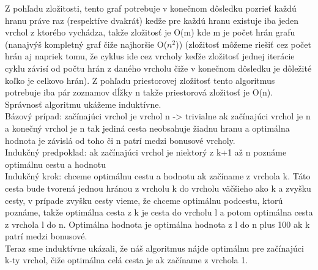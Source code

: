 \documentclass[a4paper]{article}
\begin{document}
Z pohľadu zložitosti, tento graf potrebuje v konečnom dôsledku pozrieť každú hranu práve raz (respektíve dvakrát) keďže pre každú hranu existuje iba jeden vrchol z ktorého vychádza, takže zložitosť je O(m) kde m je počet hrán grafu (nanajvýš kompletný graf čiže najhoršie O($n^2$)) (zložitosť môžeme riešiť cez počet hrán aj napriek tomu, že cyklus ide cez vrcholy keďže zložitosť jednej iterácie cyklu závisí od počtu hrán z daného vrcholu čiže v konečnom dôsledku je dôležité koľko je celkovo hrán). Z pohľadu priestorovej zložitosť tento algoritmus potrebuje iba pár zoznamov dĺžky n takže priestorová zložitosť je O(n).
\\

Správnosť algoritmu ukážeme induktívne. 
\\

Bázový prípad: začínajúci vrchol je vrchol n -> trivialne ak začínajúci vrchol je n a konečný vrchol je n tak jediná cesta neobsahuje žiadnu hranu a optimálna hodnota je závislá od toho či n patrí medzi bonusové vrcholy.
\\

Indukčný predpoklad: ak začínajúci vrchol je niektorý z k+1 až n poznáme optimálnu cestu a hodnotu
\\

Indukčný krok: chceme optimálnu cestu a hodnotu ak začíname z vrchola k. Táto cesta bude tvorená jednou hránou z vrcholu k do vrcholu väčšieho ako k a zvyšku cesty, v prípade zvyšku cesty vieme, že chceme optimálnu podcestu, ktorú poznáme, takže optimálna cesta z k je cesta do vrcholu l a potom optimálna cesta z vrchola l do n. Optimálna hodnota je optimálna hodnota z l do n plus 100 ak k patrí medzi bonusové.
\\

Teraz sme induktívne ukázali, že náš algoritmus nájde optimálnu pre začínajúci k-ty vrchol, čiže optimálna celá cesta je ak začíname z vrchola 1.
 
\end{document}
